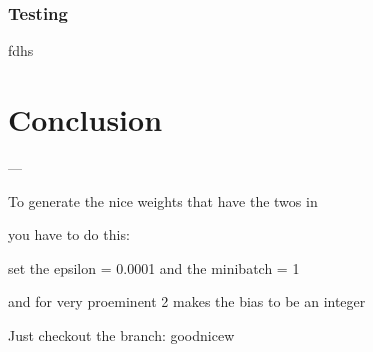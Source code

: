 \documentclass[11pt, fleqn, twoside]{article}
\begin{document}
\subsubsection{ Testing}
fdhs

\section{Conclusion}


---

To generate the nice weights that have the twos in

you have to do this:

set the epsilon = 0.0001 and the
minibatch = 1

and for very proeminent 2 makes the bias to be an integer

Just checkout the branch: goodnicew


\newpage{}
\printbibliography
\end{document}
